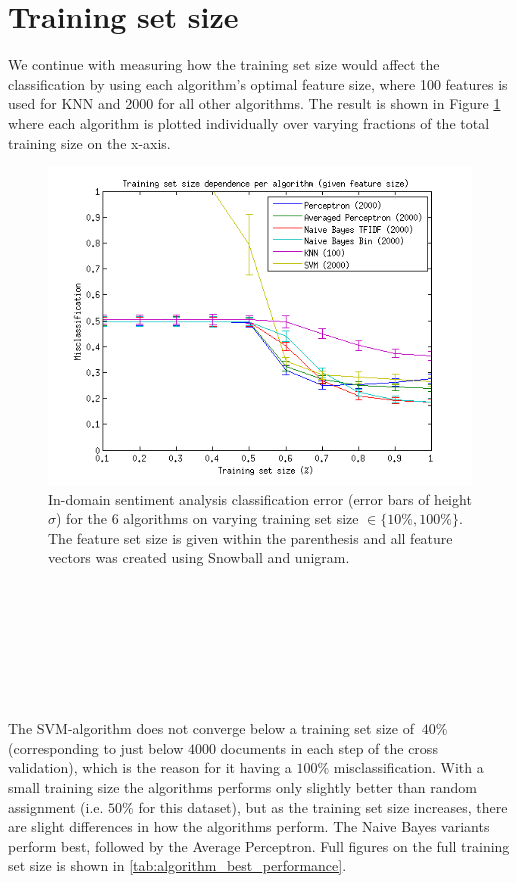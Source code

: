 \section{Training set size}
We continue with measuring how the training set size would affect the classification by using each algorithm's optimal feature size, where 100 features is used for KNN and 2000 for all other algorithms. The result is shown in Figure \ref{fig:trainingsize} where each algorithm is plotted individually over varying fractions of the total training size on the x-axis.\\
\begin{figure}[h!]
\centering
\includegraphics[width=1\linewidth]{../Plottar/training_size_k_2000allknn_100.png}
\caption{In-domain sentiment analysis classification error (error bars of height $\sigma$) for the 6 algorithms on varying training set size $\in \{10\%, 100\%\}$. The feature set size is given within the parenthesis and all feature vectors was created using Snowball and unigram.}
\label{fig:trainingsize}
\end{figure}\\\\\\\\\\\\\\
The SVM-algorithm does not converge below a training set size of $~40\%$ (corresponding to just below $4 000$ documents in each step of the cross validation), which is the reason for it having a $100\%$ misclassification. With a small training size the algorithms performs only slightly better than random assignment (i.e. $50\%$ for this dataset), but as the training set size increases, there are slight differences in how the algorithms perform. The Naive Bayes variants perform best, followed by the Average Perceptron. Full figures on the full training set size is shown in \ref{tab:algorithm_best_performance}.\\
